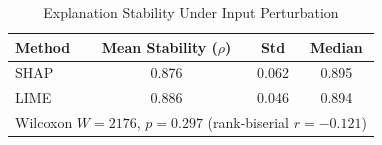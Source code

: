 \begin{table}[htbp]
\centering
\caption{Explanation Stability Under Input Perturbation}
\label{tab:stability}
\begin{tabular}{lccc}
\toprule
\textbf{Method} & \textbf{Mean Stability ($\rho$)} & \textbf{Std} & \textbf{Median} \\
\midrule
SHAP & 0.876 & 0.062 & 0.895 \\
LIME & 0.886 & 0.046 & 0.894 \\
\midrule
\multicolumn{4}{l}{Wilcoxon $W = 2176$, $p = 0.297$ (rank-biserial $r = -0.121$)} \\
\bottomrule
\end{tabular}
\end{table}
